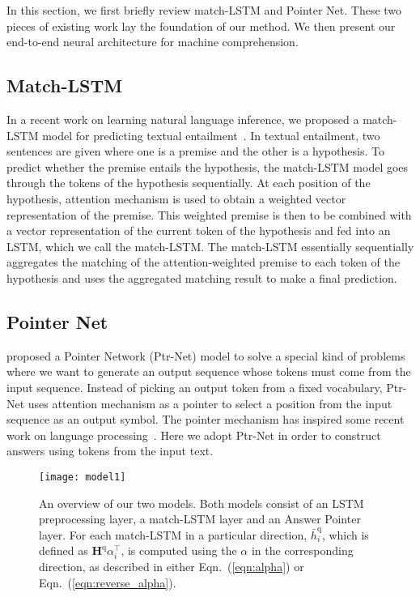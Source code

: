 \documentclass{article} \usepackage{iclr2017_conference,times}
\begin{document}
In this section, we first briefly review match-LSTM and Pointer Net.
These two pieces of existing work lay the foundation of our method.
We then present our end-to-end neural architecture for machine comprehension.

\subsection{Match-LSTM}

In a recent work on learning natural language inference, we proposed a match-LSTM model for predicting textual entailment~\citep{wang2015learning:NAACL2016}.
In textual entailment, two sentences are given where one is a premise and the other is a hypothesis.
To predict whether the premise entails the hypothesis, the match-LSTM model goes through the tokens of the hypothesis sequentially.
At each position of the hypothesis, attention mechanism is used to obtain a weighted vector representation of the premise.
This weighted premise is then to be combined with a vector representation of the current token of the hypothesis and fed into an LSTM, which we call the match-LSTM. 
The match-LSTM essentially sequentially aggregates the matching of the attention-weighted premise to each token of the hypothesis and uses the aggregated matching result to make a final prediction.


\subsection{Pointer Net}

\citet{vinyals2015pointer:NIPS2015} proposed a Pointer Network (Ptr-Net) model to solve a special kind of problems where we want to generate an output sequence whose tokens must come from the input sequence.
Instead of picking an output token from a fixed vocabulary, Ptr-Net uses attention mechanism as a pointer to select a position from the input sequence as an output symbol.
The pointer mechanism has inspired some recent work on language processing~\citep{gu2016copynet, kadlec2016text:ACL2016}.
Here we adopt Ptr-Net in order to construct answers using tokens from the input text.

\begin{figure}[]
\centering
\texttt{[image: model1]}
\caption{An overview of our two models. 
Both models consist of an LSTM preprocessing layer, a match-LSTM layer and an Answer Pointer layer. For each match-LSTM in a particular direction, $\bar{h}^\text{q}_i$, which is defined as $\textbf{H}^\text{q} \alpha_i^{\intercal}$, is computed using the $\alpha$ in the corresponding direction, as described in either Eqn.~(\ref{eqn:alpha}) or Eqn.~(\ref{eqn:reverse_alpha}).}
\label{fig:model}
\end{figure}
\end{document}
